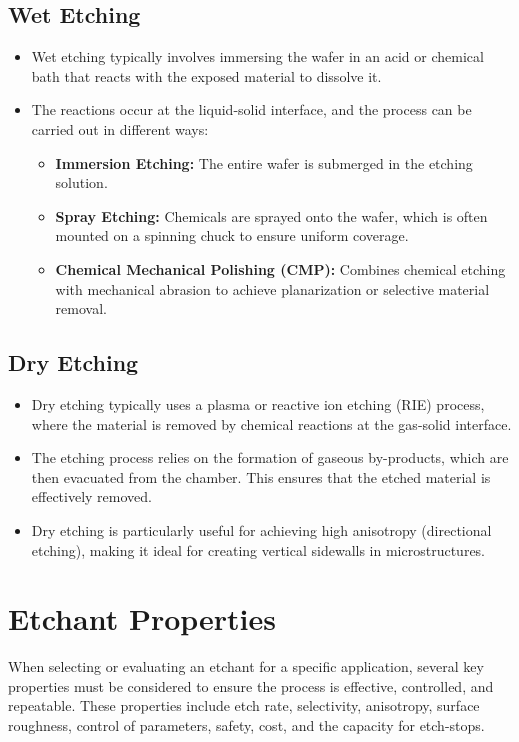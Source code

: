 \documentclass{report}
\begin{document}
\subsection{Wet Etching}
\begin{itemize}
    \item Wet etching typically involves immersing the wafer in an acid or chemical bath that reacts with the exposed material to dissolve it.
    \item The reactions occur at the liquid-solid interface, and the process can be carried out in different ways:
    \begin{itemize}
        \item \textbf{Immersion Etching:} The entire wafer is submerged in the etching solution.
        \item \textbf{Spray Etching:} Chemicals are sprayed onto the wafer, which is often mounted on a spinning chuck to ensure uniform coverage.
        \item \textbf{Chemical Mechanical Polishing (CMP):} Combines chemical etching with mechanical abrasion to achieve planarization or selective material removal.
    \end{itemize}
\end{itemize}

\subsection{Dry Etching}
\begin{itemize}
    \item Dry etching typically uses a plasma or reactive ion etching (RIE) process, where the material is removed by chemical reactions at the gas-solid interface.
    \item The etching process relies on the formation of gaseous by-products, which are then evacuated from the chamber. This ensures that the etched material is effectively removed.
    \item Dry etching is particularly useful for achieving high anisotropy (directional etching), making it ideal for creating vertical sidewalls in microstructures.
\end{itemize}
\section{Etchant Properties}

When selecting or evaluating an etchant for a specific application, several key properties must be considered to ensure the process is effective, controlled, and repeatable. These properties include etch rate, selectivity, anisotropy, surface roughness, control of parameters, safety, cost, and the capacity for etch-stops.
\end{document}
